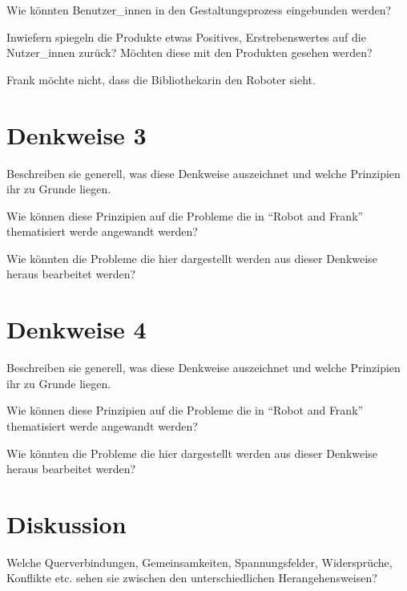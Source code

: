 \documentclass[sigchi-a, authorversion]{acmart}
\begin{document}
Wie könnten Benutzer_innen in den Gestaltungsprozess eingebunden werden?

Inwiefern spiegeln die Produkte etwas Positives, Erstrebenswertes auf die Nutzer_innen zurück? Möchten
diese mit den Produkten gesehen werden?

Frank möchte nicht, dass die Bibliothekarin den Roboter sieht.

\section{Denkweise 3}

Beschreiben sie generell, was diese Denkweise auszeichnet und welche Prinzipien ihr zu Grunde liegen.

Wie können diese Prinzipien auf die Probleme die in ``Robot and Frank'' thematisiert werde angewandt werden?

Wie könnten die Probleme die hier dargestellt werden aus dieser Denkweise heraus bearbeitet werden?

\section{Denkweise 4}

Beschreiben sie generell, was diese Denkweise auszeichnet und welche Prinzipien ihr zu Grunde liegen.

Wie können diese Prinzipien auf die Probleme die in ``Robot and Frank'' thematisiert werde angewandt werden?

Wie könnten die Probleme die hier dargestellt werden aus dieser Denkweise heraus bearbeitet werden?


\section{Diskussion}

Welche Querverbindungen, Gemeinsamkeiten, Spannungsfelder, Widersprüche, Konflikte etc. sehen sie zwischen den unterschiedlichen Herangehensweisen?
\end{document}

